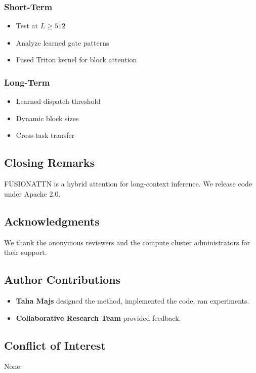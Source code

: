 \subsubsection{Short-Term}
\begin{itemize}
\item Test at $L \geq 512$
\item Analyze learned gate patterns
\item Fused Triton kernel for block attention

\end{itemize}
\subsubsection{Long-Term}
\begin{itemize}
\item Learned dispatch threshold
\item Dynamic block sizes
\item Cross-task transfer

\end{itemize}
\subsection{Closing Remarks}

FUSIONATTN is a hybrid attention for long-context inference. We release 
code under Apache 2.0.

\subsection{Acknowledgments}

We thank the anonymous reviewers and the compute cluster administrators for their support.

\subsection{Author Contributions}

\begin{itemize}
\item \textbf{Taha Majs} designed the method, implemented the code, ran experiments.
\item \textbf{Collaborative Research Team} provided feedback.

\end{itemize}
\subsection{Conflict of Interest}

None.

